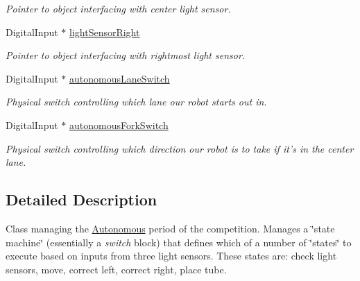 \begin{DoxyCompactItemize}
\begin{DoxyCompactList}\small\item\em Pointer to object interfacing with center light sensor. \item\end{DoxyCompactList}\item 
\hypertarget{class_r_j_f_r_c2011_1_1_autonomous_a8ada7ae26d2b78274febe96a415c7fb0}{
DigitalInput $\ast$ \hyperlink{class_r_j_f_r_c2011_1_1_autonomous_a8ada7ae26d2b78274febe96a415c7fb0}{lightSensorRight}}
\label{class_r_j_f_r_c2011_1_1_autonomous_a8ada7ae26d2b78274febe96a415c7fb0}

\begin{DoxyCompactList}\small\item\em Pointer to object interfacing with rightmost light sensor. \item\end{DoxyCompactList}\item 
\hypertarget{class_r_j_f_r_c2011_1_1_autonomous_afa181f57e25cab35aa5eeffdbc1bd43d}{
DigitalInput $\ast$ \hyperlink{class_r_j_f_r_c2011_1_1_autonomous_afa181f57e25cab35aa5eeffdbc1bd43d}{autonomousLaneSwitch}}
\label{class_r_j_f_r_c2011_1_1_autonomous_afa181f57e25cab35aa5eeffdbc1bd43d}

\begin{DoxyCompactList}\small\item\em Physical switch controlling which lane our robot starts out in. \item\end{DoxyCompactList}\item 
\hypertarget{class_r_j_f_r_c2011_1_1_autonomous_aff3688fd6c4119516863947014e17aca}{
DigitalInput $\ast$ \hyperlink{class_r_j_f_r_c2011_1_1_autonomous_aff3688fd6c4119516863947014e17aca}{autonomousForkSwitch}}
\label{class_r_j_f_r_c2011_1_1_autonomous_aff3688fd6c4119516863947014e17aca}

\begin{DoxyCompactList}\small\item\em Physical switch controlling which direction our robot is to take if it's in the center lane. \item\end{DoxyCompactList}\end{DoxyCompactItemize}


\subsection{Detailed Description}
Class managing the \hyperlink{class_r_j_f_r_c2011_1_1_autonomous}{Autonomous} period of the competition. Manages a \char`\"{}state machine\char`\"{} (essentially a {\itshape switch\/} block) that defines which of a number of \char`\"{}states\char`\"{} to execute based on inputs from three light sensors. These states are: check light sensors, move, correct left, correct right, place tube. 

